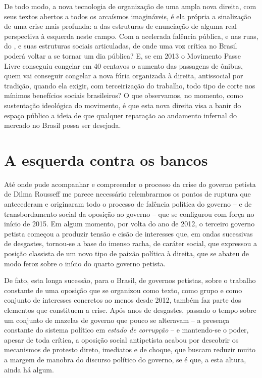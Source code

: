 De todo modo, a nova tecnologia de organização de uma ampla nova
direita, com seus textos abertos a todos os arcaísmos imagináveis, é ela
própria a sinalização de uma crise mais profunda: a das estruturas de
enunciação de alguma real perspectiva à esquerda neste campo. Com a
acelerada falência pública, e nas ruas, do , e suas estruturas sociais
articuladas, de onde uma voz crítica no Brasil poderá voltar a se tornar
um dia pública? E, se em 2013 o Movimento Passe Livre conseguiu congelar
em 40 centavos o aumento das passagens de ônibus, quem vai conseguir
congelar a nova fúria organizada à direita, antissocial por tradição,
quando ela exigir, com terceirização do trabalho, todo tipo de corte nos
mínimos benefícios sociais brasileiros? O que observamos, no momento,
como sustentação ideológica do movimento, é que esta nova direita visa a
banir do espaço público a ideia de que qualquer reparação ao andamento
infernal do mercado no Brasil possa ser desejada.

  \section{A esquerda contra os
  bancos}\label{a-esquerda-contra-os-bancos}

Até onde pude acompanhar e compreender o processo da crise do governo
petista de Dilma Rousseff me parece necessário relembrarmos os pontos de
ruptura que antecederam e originaram todo o processo de falência
política do governo -- e de transbordamento social da oposição ao
governo -- que se configurou com força no início de 2015. Em algum
momento, por volta do ano de 2012, o terceiro governo petista começou a
produzir tensão e cisão de interesses que, em ondas
sucessivas de desgastes, tornou-se a base do imenso racha, de caráter
social, que expressou a posição classista de um novo tipo de paixão
política à direita, que se abateu de modo feroz sobre o início do quarto
governo petista.

De fato, esta longa sucessão, para o Brasil, de governos petistas, sobre
o trabalho constante de uma oposição que se organizou como texto, como
grupo e como conjunto de interesses concretos ao menos desde 2012,
também faz parte dos elementos que constituem a crise. Após anos de
desgastes, passado o tempo sobre um conjunto de mazelas de governo que
pouco se alteravam -- a presença constante do sistema político em
\emph{estado de corrupção} -- e mantendo-se o poder, apesar de toda
crítica, a oposição social antipetista acabou por descobrir os
mecanismos de protesto direto, imediatos e de choque, que buscam reduzir
muito a margem de manobra do discurso político do governo, se é que, a
esta altura, ainda há algum.

